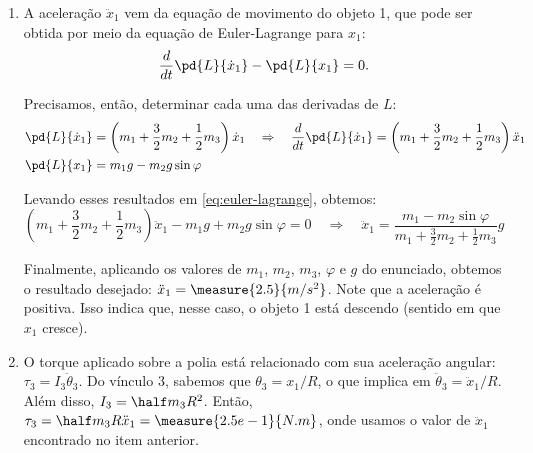 \begin{question}
\begin{solution}
\begin{enumerate}
			\item A aceleração $\ddot x_1$ vem da equação de movimento do objeto 1, que pode ser obtida por meio da equação de Euler-Lagrange para $x_1$:
			\begin{equation}\label{eq:euler-lagrange}
				\frac{d}{dt}\pd{L}{\dot x_1} - \pd{L}{x_1} = 0.
			\end{equation}

			Precisamos, então, determinar cada uma das derivadas de $L$:
			\begin{align*}
				\pd{L}{\dot x_1} &= \left(m_1 + \frac{3}{2}m_2 + \frac{1}{2}m_3\right)\dot x_1 \quad\Rightarrow\quad
					\frac{d}{dt}\pd{L}{\dot x_1} = \left(m_1 + \frac{3}{2}m_2 + \frac{1}{2}m_3\right)\ddot x_1 \\
				\pd{L}{x_1} &= m_1g - m_2g\sin\varphi
			\end{align*}

			Levando esses resultados em \eqref{eq:euler-lagrange}, obtemos:
			\begin{equation*}
				\left(m_1 + \frac{3}{2}m_2 + \frac{1}{2}m_3\right)\ddot x_1 - m_1 g + m_2 g \sin \varphi = 0
				\quad\Rightarrow\quad
				\ddot x_1 = \frac{m_1 - m_2 \sin \varphi}{m_1 + \frac{3}{2}m_2 + \frac{1}{2}m_3}g
			\end{equation*}

			Finalmente, aplicando os valores de $m_1$, $m_2$, $m_3$, $\varphi$ e $g$ do enunciado, obtemos o resultado desejado: $\ddot x_1 = \measure{2.5}{m/s^2}$.
			Note que a aceleração é positiva.
			Isso indica que, nesse caso, o objeto 1 está descendo (sentido em que $x_1$ cresce).

			\item O torque aplicado sobre a polia está relacionado com sua aceleração angular: $\tau_3 = I_3 \ddot\theta_3$.
			Do vínculo 3, sabemos que $\theta_3 = x_1/R$, o que implica em $\ddot\theta_3 = \ddot x_1/R$.
			Além disso, $I_3 = \half m_3 R^2$.
			Então, $\tau_3 = \half m_3 R \ddot x_1 = \measure{2.5e-1}{N.m}$, onde usamos o valor de $\ddot x_1$ encontrado no item anterior.
		\end{enumerate}
	\end{solution}
\end{question}